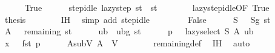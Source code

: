 \begin{isabellebody}
\ \ \ \ \isamarkupfalse%
\ True\isanewline
\ \ \ \ \isamarkupfalse%
\ step{\isacharunderscore}{\kern0pt}idle{\isacharcolon}{\kern0pt}\ {\isachardoublequoteopen}lazy{\isacharunderscore}{\kern0pt}step\ {\isacharquery}{\kern0pt}st\ {\isacharequal}{\kern0pt}\ {\isacharquery}{\kern0pt}st{\isachardoublequoteclose}\isanewline
\ \ \ \ \ \ \isamarkupfalse%
\ lazy{\isacharunderscore}{\kern0pt}step{\isacharunderscore}{\kern0pt}idle{\isacharbrackleft}{\kern0pt}OF\ True{\isacharbrackright}{\kern0pt}\ \isakeywordONE{{\isachardot}{\kern0pt}}\isamarkupfalse%
\isanewline
\ \ \ \ \isamarkupfalse%
\ {\isacharquery}{\kern0pt}thesis\isanewline
\ \ \ \ \ \ \isamarkupfalse%
\ IH\ \isamarkupfalse%
\ {\isacharparenleft}{\kern0pt}simp\ add{\isacharcolon}{\kern0pt}\ step{\isacharunderscore}{\kern0pt}idle{\isacharparenright}{\kern0pt}\isanewline
\ \ \isamarkupfalse%
\isanewline
\ \ \ \ \isamarkupfalse%
\ False\isanewline
\ \ \ \ \isamarkupfalse%
\ {\isacharquery}{\kern0pt}S\ \ {\isacharequal}{\kern0pt}\ {\isachardoublequoteopen}Sg\ {\isacharquery}{\kern0pt}st{\isachardoublequoteclose}\isanewline
\ \ \ \ \isamarkupfalse%
\ {\isacharquery}{\kern0pt}A\ \ {\isacharequal}{\kern0pt}\ {\isachardoublequoteopen}remaining\ {\isacharquery}{\kern0pt}st{\isachardoublequoteclose}\isanewline
\ \ \ \ \isamarkupfalse%
\ {\isacharquery}{\kern0pt}ub\ {\isacharequal}{\kern0pt}\ {\isachardoublequoteopen}ubg\ {\isacharquery}{\kern0pt}st{\isachardoublequoteclose}\isanewline
\ \ \ \ \isamarkupfalse%
\ {\isacharquery}{\kern0pt}p\ \ {\isacharequal}{\kern0pt}\ {\isachardoublequoteopen}lazy{\isacharunderscore}{\kern0pt}select\ {\isacharquery}{\kern0pt}S\ {\isacharquery}{\kern0pt}A\ {\isacharquery}{\kern0pt}ub{\isachardoublequoteclose}\isanewline
\ \ \ \ \isamarkupfalse%
\ {\isacharquery}{\kern0pt}x\ \ {\isacharequal}{\kern0pt}\ {\isachardoublequoteopen}fst\ {\isacharquery}{\kern0pt}p{\isachardoublequoteclose}\isanewline
\isanewline
\ \ \ \ \isamarkupfalse%
\ A{\isacharunderscore}{\kern0pt}subV{\isacharcolon}{\kern0pt}\ {\isachardoublequoteopen}{\isacharquery}{\kern0pt}A\ {\isasymsubseteq}\ V{\isachardoublequoteclose}\isanewline
\ \ \ \ \ \ \isamarkupfalse%
\ remaining{\isacharunderscore}{\kern0pt}def\ \isamarkupfalse%
\ IH\ \isamarkupfalse%
\ auto\isanewline
\isanewline

\end{isabellebody}
